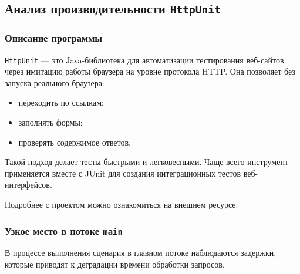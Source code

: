 \subsection{Анализ производительности \texttt{HttpUnit}}

\subsubsection{Описание программы}

\texttt{HttpUnit} --- это Java-библиотека для автоматизации тестирования веб-сайтов через имитацию работы браузера на уровне протокола HTTP. Она позволяет без запуска реального браузера:
\begin{itemize}
  \item переходить по ссылкам;
  \item заполнять формы;
  \item проверять содержимое ответов.
\end{itemize}

Такой подход делает тесты быстрыми и легковесными. Чаще всего инструмент применяется вместе с JUnit для создания интеграционных тестов веб-интерфейсов.

Подробнее с проектом можно ознакомиться на внешнем ресурсе\cite{httpunit_website}.

\subsubsection{Узкое место в потоке \texttt{main}}


В процессе выполнения сценария в главном потоке наблюдаются задержки, которые приводят к деградации времени обработки запросов.


